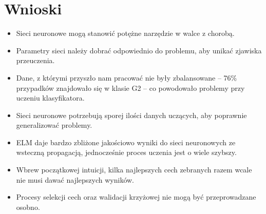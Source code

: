 \chapter{Wnioski}
\begin{itemize}
	\item{Sieci neuronowe mogą stanowić potężne narzędzie w walce z chorobą.}
	\item{Parametry sieci należy dobrać odpowiednio do problemu, aby unikać zjawiska przeuczenia.}
	\item{Dane, z którymi przyszło nam pracować nie były zbalansowane -- 76\% przypadków znajdowało się w klasie G2 -- co powodowało problemy przy uczeniu klasyfikatora.}
	\item{Sieci neuronowe potrzebują sporej ilości danych uczących, aby poprawnie generalizować problemy.}
	\item{ELM daje bardzo zbliżone jakościowo wyniki do sieci neuronowych ze wsteczną propagacją, jednocześnie proces uczenia jest o wiele szybszy.}
	\item{Wbrew początkowej intuicji, kilka najlepszych cech zebranych razem wcale nie musi dawać najlepszych wyników.}
	\item{Procesy selekcji cech oraz walidacji krzyżowej nie mogą być przeprowadzane osobno.}
\end{itemize}